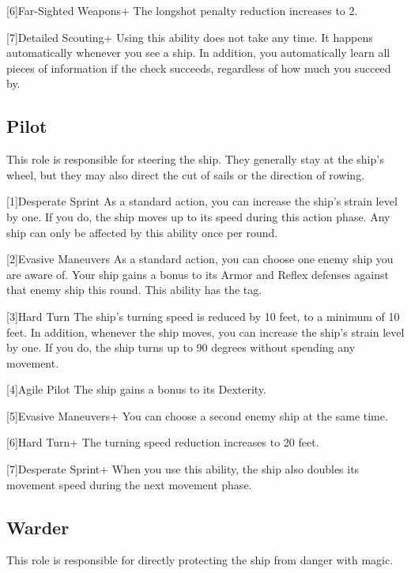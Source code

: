         [6]{Far-Sighted Weapons+} The longshot penalty reduction increases to 2.

        [7]{Detailed Scouting+} Using this ability does not take any time.
        It happens automatically whenever you see a ship.
        In addition, you automatically learn all pieces of information if the check succeeds, regardless of how much you succeed by.

    \subsection{Pilot}
        This role is responsible for steering the ship.
        They generally stay at the ship's wheel, but they may also direct the cut of sails or the direction of rowing.

        [1]{Desperate Sprint} As a standard action, you can increase the ship's strain level by one.
        If you do, the ship moves up to its speed during this action phase.
        Any ship can only be affected by this ability once per round.

        [2]{Evasive Maneuvers} As a standard action, you can choose one enemy ship you are aware of.
        Your ship gains a  bonus to its Armor and Reflex defenses against that enemy ship this round.
        This ability has the  tag.

        [3]{Hard Turn} The ship's turning speed is reduced by 10 feet, to a minimum of 10 feet.
        In addition, whenever the ship moves, you can increase the ship's strain level by one.
        If you do, the ship turns up to 90 degrees without spending any movement.

        [4]{Agile Pilot} The ship gains a  bonus to its Dexterity.

        [5]{Evasive Maneuvers+} You can choose a second enemy ship at the same time.

        [6]{Hard Turn+} The turning speed reduction increases to 20 feet.

        [7]{Desperate Sprint+} When you use this ability, the ship also doubles its movement speed during the next movement phase.

    \subsection{Warder}
        This role is responsible for directly protecting the ship from danger with magic.

